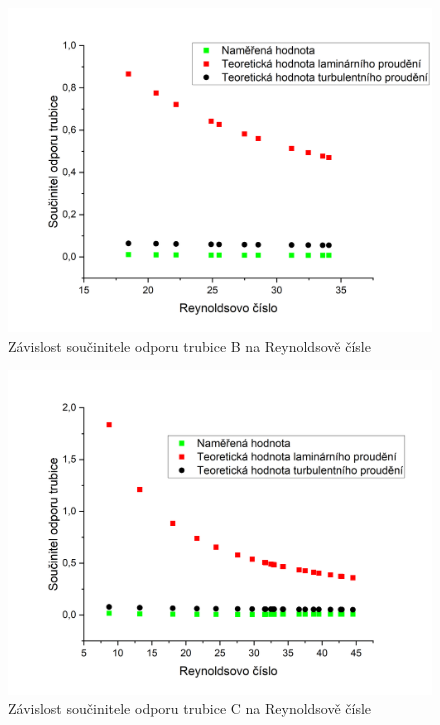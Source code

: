     \begin{figure}[h]
        \centering
        \includegraphics[width=1\linewidth]{01 - Studium proudění viskózní kapaliny trubicemi kruhového průřezu//Protokol//img/Re(k) B.png}
        \caption{Závislost součinitele odporu trubice B na Reynoldsově čísle}
        \label{fig:Re(k)) B}
    \end{figure}

    \begin{figure}[h]
        \centering
        \includegraphics[width=1\linewidth]{01 - Studium proudění viskózní kapaliny trubicemi kruhového průřezu//Protokol//img/Re(k) C.png}
        \caption{Závislost součinitele odporu trubice C na Reynoldsově čísle}
        \label{fig:Re(k) C}
    \end{figure}
    
